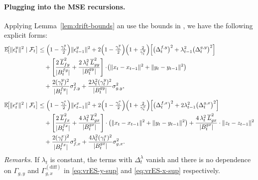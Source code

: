 \documentclass{uai2026} %
\newcommand{\EE}{\mathbb{E}}
\newcommand{\F}{\mathcal{F}}
\begin{document}
\paragraph{Plugging into the MSE recursions.}
Applying Lemma~\ref{lem:drift-bounds} an use the bounds in , we have the following explicit forms:
\begin{align}
\EE\!\big[\|\epsilon_t^y\|^2\mid\F_t\big]
&\le \Big(1-\tfrac{\gamma_t^y}{2}\Big)\|\epsilon_{t-1}^y\|^2
+ 2\Big(1-\tfrac{\gamma_t^y}{2}\Big)\Big(1+\tfrac{2}{\gamma_t^y}\Big)\!\left[
\big(\Delta_t^{f,y}\big)^2+\lambda_{t-1}^2\big(\Delta_t^{g,y}\big)^2\right]\notag\\
&\quad + \left[\frac{2\,\overline L_{fy}^2}{|B_t^{fy}|}+ \frac{2\,\lambda_t^2\,\overline L_{gy}^2}{|B_t^{gy}|}\right]\cdot\!\left(\|x_t-x_{t-1}\|^2+\|y_t-y_{t-1}\|^2\right)\notag\\
&\quad + \frac{2(\gamma_t^y)^2}{|B_t^{fy}|}\sigma_{f,y}^2
+ \frac{2\lambda_t^2(\gamma_t^y)^2}{|B_t^{gy}|}\sigma_{g,y}^2,
\label{eq:vrES-y-sup}
\\[0.5em]
\EE\!\big[\|\epsilon_t^x\|^2\mid\F_t\big]
&\le \Big(1-\tfrac{\gamma_t^x}{2}\Big)\|\epsilon_{t-1}^x\|^2
+ 2\Big(1-\tfrac{\gamma_t^x}{2}\Big)\Big(1+\tfrac{2}{\gamma_t^x}\Big)\!\left[
\big(\Delta_t^{f,x}\big)^2+2\lambda_{t-1}^2\big(\Delta_t^{g,x}\big)^2\right]\notag\\
&\quad + \left[\frac{2\,\overline L_{fx}^2}{|B_t^{fx}|}+\frac{4\,\lambda_t^2\,\overline L_{gx}^2}{|B_t^{gx}|}\right]\cdot\left(\|x_t-x_{t-1}\|^2+\|y_t-y_{t-1}\|^2\right)
+ \frac{4\,\lambda_t^2\,\overline L_{gx}^2}{|B_t^{gx}|}\cdot\|z_t-z_{t-1}\|^2\notag\\
&\quad + \frac{2(\gamma_t^x)^2}{|B_t^{fx}|}\sigma_{f,x}^2
+ \frac{4\lambda_t^2(\gamma_t^x)^2}{|B_t^{gx}|}\sigma_{g,x}^2.
\label{eq:vrES-x-sup}
\end{align}
\emph{Remarks.} If $\lambda_t$ is constant, the terms with $\Delta_t^{\lambda}$ vanish and there is no dependence on $\Gamma_{g,y}$ and $\Gamma_{g,x}^{(\mathrm{diff})}$ in \eqref{eq:vrES-y-sup} and \eqref{eq:vrES-x-sup} respectively.
\end{document}

